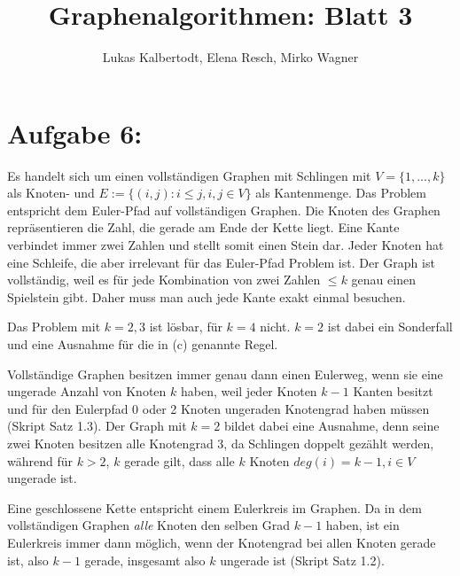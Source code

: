 \documentclass[11pt]{scrartcl} %
\title{Graphenalgorithmen: Blatt 3}
\author{Lukas Kalbertodt, Elena Resch, Mirko Wagner}
\begin{document}
\maketitle
\section*{Aufgabe 6:}
\begin{compactenum}[(a)]
\item Es handelt sich um einen vollständigen Graphen mit Schlingen mit $V = \lbrace {1,...,k} \rbrace $ als Knoten- und $E:= \lbrace (i,j): i \le j, i,j \in V \rbrace$ als Kantenmenge. Das Problem entspricht dem Euler-Pfad auf vollständigen Graphen. 
Die Knoten des Graphen repräsentieren die Zahl, die gerade am Ende der Kette liegt. Eine Kante verbindet immer zwei Zahlen und stellt somit einen Stein dar. Jeder Knoten hat eine Schleife, die aber irrelevant für das Euler-Pfad Problem ist. Der Graph ist vollständig, weil es für jede Kombination von zwei Zahlen $\le k$ genau einen Spielstein gibt. Daher muss man auch jede Kante exakt einmal besuchen.
\item Das Problem mit $k=2,3$ ist lösbar, für $k=4$ nicht. $k=2$ ist dabei ein Sonderfall und eine Ausnahme für die in (c) genannte Regel.
\item Vollständige Graphen besitzen immer genau dann einen Eulerweg, wenn sie eine ungerade Anzahl von Knoten $k$ haben, weil jeder Knoten $k-1$ Kanten besitzt und für den Eulerpfad 0 oder 2 Knoten ungeraden Knotengrad haben müssen (Skript Satz 1.3). Der Graph mit $k=2$ bildet dabei eine Ausnahme, denn seine zwei Knoten besitzen alle Knotengrad $3$, da Schlingen doppelt gezählt werden, während für $k > 2$, $k$  gerade gilt, dass alle $k$ Knoten $deg(i) = k-1, i \in V$ ungerade ist.
\item Eine geschlossene Kette entspricht einem Eulerkreis im Graphen. Da in dem vollständigen Graphen \emph{alle} Knoten den selben Grad $k-1$ haben, ist ein Eulerkreis immer dann möglich, wenn der Knotengrad bei allen Knoten gerade ist, also $k-1$ gerade, insgesamt also $k$ ungerade ist (Skript Satz 1.2).
\end{compactenum}
\end{document}
